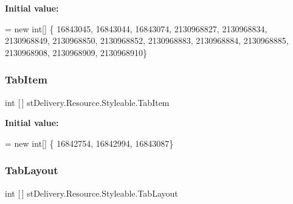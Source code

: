 {\bfseries Initial value\+:}
\begin{DoxyCode}
= \textcolor{keyword}{new} \textcolor{keywordtype}{int}[] \{
                    16843045,
                    16843044,
                    16843074,
                    2130968827,
                    2130968834,
                    2130968849,
                    2130968850,
                    2130968852,
                    2130968883,
                    2130968884,
                    2130968885,
                    2130968908,
                    2130968909,
                    2130968910\}
\end{DoxyCode}
\mbox{\label{classst_delivery_1_1_resource_1_1_styleable_a18c8104725a3a1ea9f25174f56b1247f}} 
\subsubsection{\texorpdfstring{Tab\+Item}{TabItem}}
{\footnotesize\ttfamily int \mbox{[}$\,$\mbox{]} st\+Delivery.\+Resource.\+Styleable.\+Tab\+Item\hspace{0.3cm}{\ttfamily [static]}}

{\bfseries Initial value\+:}
\begin{DoxyCode}
= \textcolor{keyword}{new} \textcolor{keywordtype}{int}[] \{
                    16842754,
                    16842994,
                    16843087\}
\end{DoxyCode}
\mbox{\label{classst_delivery_1_1_resource_1_1_styleable_a8ec17b67c8deca64759674356f3d89ff}} 
\subsubsection{\texorpdfstring{Tab\+Layout}{TabLayout}}
{\footnotesize\ttfamily int \mbox{[}$\,$\mbox{]} st\+Delivery.\+Resource.\+Styleable.\+Tab\+Layout\hspace{0.3cm}{\ttfamily [static]}}

